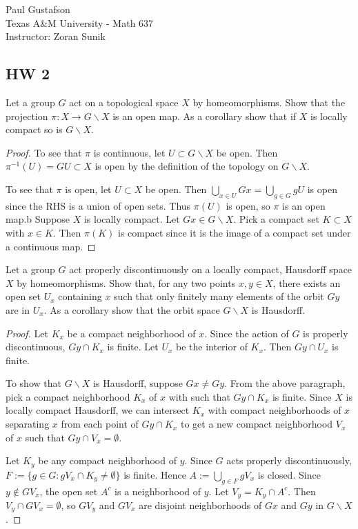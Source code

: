 \documentclass{article}
\begin{document}
\noindent Paul Gustafson\\
\noindent Texas A\&M University - Math 637\\ 
\noindent Instructor: Zoran Sunik

\subsection*{HW 2}
 Let a group $G$ act on a topological space $X$ by homeomorphisms.  Show that the projection $\pi: X \to G \backslash X$ is an open map.
 As a corollary show that  if $X$ is locally compact so is $G \backslash X$.
\begin{proof}
To see that $\pi$ is continuous, let $U \subset G \backslash X$ be open.  Then $\pi^{-1}(U) = GU \subset X$ is open by the definition of the topology on $G \backslash X$.

To see that $\pi$ is open, let $U \subset X$ be open.  Then $\bigcup_{x \in U} Gx = \bigcup_{g \in G} gU$ is open since the RHS is a union of open sets.  Thus $\pi(U)$ is open, so $\pi$ is an open map.b
Suppose $X$ is locally compact.  Let $Gx \in G \backslash X$.  Pick a compact set $K \subset X$ with $x \in K$.  Then $\pi(K)$ is compact since it is the image of a compact set under a continuous map. 
\end{proof}

 Let a group $G$ act properly discontinuously on a locally compact, Hausdorff space $X$ by homeomorphisms.  Show that, for any two points $x, y \in X$, there exists an open set $U_x$ containing $x$ such that only finitely many elements of the orbit $Gy$ are in $U_x$.
As a corollary show that the orbit space $G \backslash X$ is Hausdorff.
\begin{proof}
Let $K_x$ be a compact neighborhood of $x$.   Since the action of $G$ is properly discontinuous, $Gy \cap K_x$ is finite.  Let $U_x$ be the interior of $K_x$.  Then $Gy \cap U_x$ is finite.

To show that $G \backslash X$ is Hausdorff, suppose $Gx \neq Gy$. From the above paragraph, pick a compact neighborhood $K_x$ of $x$ with such that $Gy \cap K_x$ is finite.  Since $X$ is locally compact Hausdorff, we can intersect $K_x$ with compact neighborhoods of $x$ separating $x$ from each point of $Gy \cap K_x$ to get a new compact neighborhood $V_x$ of $x$ such that $Gy \cap V_x = \emptyset$. 

Let $K_y$ be any compact neighborhood of $y$.  Since $G$ acts properly discontinuously, $F := \{g \in G : gV_x \cap K_y \neq \emptyset \}$ is finite. Hence $A := \bigcup_{g \in F} gV_x$ is closed.  Since $y \not\in GV_x$, the open set $A^c$ is a neighborhood of $y$. Let $V_y = K_y \cap A^c$.  Then $V_y \cap GV_x = \emptyset$, so $GV_y$ and $GV_x$ are disjoint neighborhoods of $Gx$ and $Gy$ in $G \backslash X$.
\end{proof}
\end{document}
